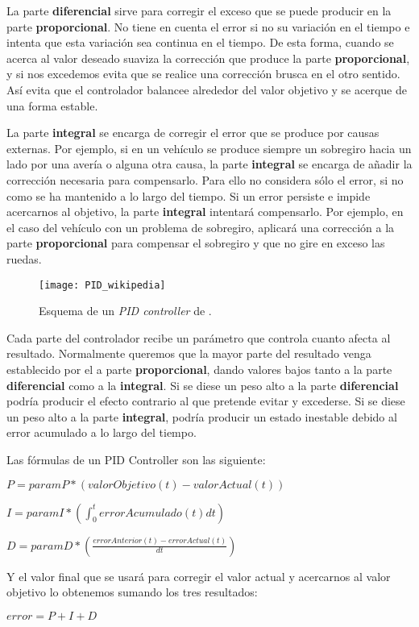 La parte \textbf{diferencial} sirve para corregir el exceso que se puede producir en la parte \textbf{proporcional}. No tiene en cuenta el error si no su variación en el tiempo e intenta que esta variación sea continua en el tiempo. De esta forma, cuando se acerca al valor deseado suaviza la corrección que produce la parte \textbf{proporcional}, y si nos excedemos evita que se realice una corrección brusca en el otro sentido. Así evita que el controlador balancee alrededor del valor objetivo y se acerque de una forma estable.

La parte \textbf{integral} se encarga de corregir el error que se produce por causas externas. Por ejemplo, si en un vehículo se produce siempre un sobregiro hacia un lado por una avería o alguna otra causa, la parte \textbf{integral} se encarga de añadir la corrección necesaria para compensarlo. Para ello no considera sólo el error, si no como se ha mantenido a lo largo del tiempo. Si un error persiste e impide acercarnos al objetivo, la parte \textbf{integral} intentará compensarlo. Por ejemplo, en el caso del vehículo con un problema de sobregiro, aplicará una corrección a la parte \textbf{proporcional} para compensar el sobregiro y que no gire en exceso las ruedas.

\begin{figure}[htpb]
    \centering
    \texttt{[image: PID\_wikipedia]}
    \caption[Esquema de un \textit{PID controller}]{Esquema de un \textit{PID controller} de \cite{wiki:pidimagen}.}
    \label{fig:basics AFM sketch}
\end{figure}

Cada parte del controlador recibe un parámetro que controla cuanto afecta al resultado. Normalmente queremos que la mayor parte del resultado venga establecido por el a parte \textbf{proporcional}, dando valores bajos tanto a la parte \textbf{diferencial} como a la \textbf{integral}. Si se diese un peso alto a la parte \textbf{diferencial} podría producir el efecto contrario al que pretende evitar y excederse. Si se diese un peso alto a la parte \textbf{integral}, podría producir un estado inestable debido al error acumulado a lo largo del tiempo.

Las fórmulas de un PID Controller son las siguiente:
\begin{center}
$P = paramP * (valorObjetivo(t) - valorActual(t))$

$I = paramI * \left(\displaystyle \int_{0}^{t} errorAcumulado(t) dt\right)$

$D = paramD * \left(\displaystyle \frac{errorAnterior(t)-errorActual(t)}{dt}\right)$
\end{center}

Y el valor final que se usará para corregir el valor actual y acercarnos al valor objetivo lo obtenemos sumando los tres resultados:
\begin{center}
$error = P + I + D$
\end{center}